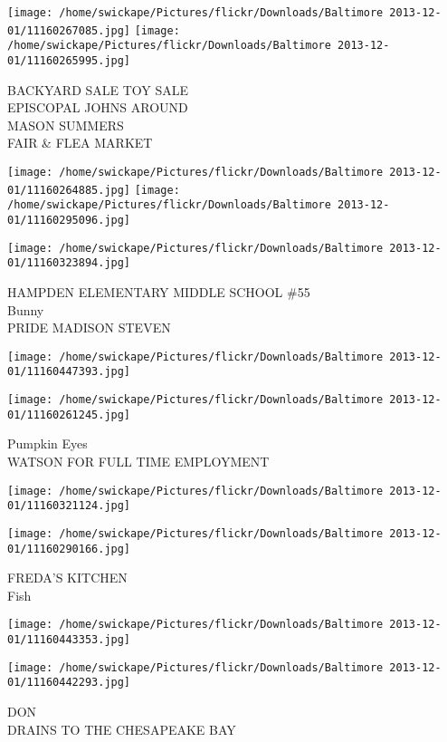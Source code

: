 \documentclass[10pt,letterpaper]{article}
\begin{document}
\texttt{[image: /home/swickape/Pictures/flickr/Downloads/Baltimore 2013-12-01/11160267085.jpg]}
\texttt{[image: /home/swickape/Pictures/flickr/Downloads/Baltimore 2013-12-01/11160265995.jpg]}

BACKYARD SALE TOY SALE\\
EPISCOPAL JOHNS AROUND\\
MASON SUMMERS\\
FAIR \& FLEA MARKET
\pagebreak

\texttt{[image: /home/swickape/Pictures/flickr/Downloads/Baltimore 2013-12-01/11160264885.jpg]}
\texttt{[image: /home/swickape/Pictures/flickr/Downloads/Baltimore 2013-12-01/11160295096.jpg]}

\vspace{0.25in}
\texttt{[image: /home/swickape/Pictures/flickr/Downloads/Baltimore 2013-12-01/11160323894.jpg]}

HAMPDEN ELEMENTARY MIDDLE SCHOOL \#55\\
Bunny\\
PRIDE MADISON STEVEN
\pagebreak

\texttt{[image: /home/swickape/Pictures/flickr/Downloads/Baltimore 2013-12-01/11160447393.jpg]}

\vspace{0.25in}
\texttt{[image: /home/swickape/Pictures/flickr/Downloads/Baltimore 2013-12-01/11160261245.jpg]}

Pumpkin Eyes\\
WATSON FOR FULL TIME EMPLOYMENT
\pagebreak

\texttt{[image: /home/swickape/Pictures/flickr/Downloads/Baltimore 2013-12-01/11160321124.jpg]}

\vspace{0.25in}
\texttt{[image: /home/swickape/Pictures/flickr/Downloads/Baltimore 2013-12-01/11160290166.jpg]}

FREDA'S KITCHEN\\
Fish
\pagebreak

\texttt{[image: /home/swickape/Pictures/flickr/Downloads/Baltimore 2013-12-01/11160443353.jpg]}

\vspace{0.25in}
\texttt{[image: /home/swickape/Pictures/flickr/Downloads/Baltimore 2013-12-01/11160442293.jpg]}

DON\\
DRAINS TO THE CHESAPEAKE BAY
\pagebreak
\end{document}
